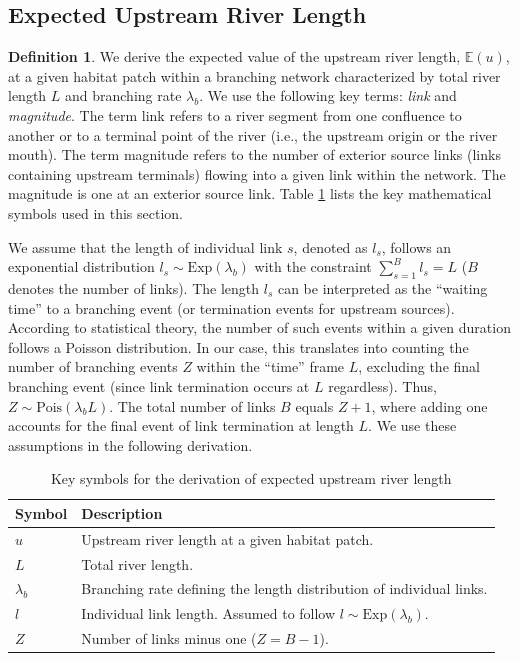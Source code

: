 \documentclass[11pt, class=article, crop=false]{standalone}
\theoremstyle{definition}
\newtheorem{definition}{Definition}[subsection]
\begin{document}
\newpage

\subsection{Expected Upstream River Length} \label{updist}

\begin{definition}
We derive the expected value of the upstream river length, $\mathbb{E}(u)$, at a given habitat patch within a branching network characterized by total river length $L$ and branching rate $\lambda_b$.
We use the following key terms: \textit{link} and \textit{magnitude}.
The term link refers to a river segment from one confluence to another or to a terminal point of the river (i.e., the upstream origin or the river mouth).
The term magnitude refers to the number of exterior source links (links containing upstream terminals) flowing into a given link within the network.
The magnitude is one at an exterior source link.
Table \ref{tab:key-symbol} lists the key mathematical symbols used in this section.

We assume that the length of individual link $s$, denoted as $l_s$, follows an exponential distribution $l_s \sim \mbox{Exp}(\lambda_b)$ with the constraint $\sum_{s = 1}^{B} l_s = L$ ($B$ denotes the number of links).
The length $l_s$ can be interpreted as the ``waiting time'' to a branching event (or termination events for upstream sources).
According to statistical theory, the number of such events within a given duration follows a Poisson distribution.
In our case, this translates into counting the number of branching events $Z$ within the ``time'' frame $L$, excluding the final branching event (since link termination occurs at $L$ regardless).
Thus, $Z \sim \mbox{Pois}(\lambda_b L)$.
The total number of links $B$ equals $Z + 1$, where adding one accounts for the final event of link termination at length $L$.
We use these assumptions in the following derivation.

\begin{table}
    \centering
    \caption{Key symbols for the derivation of expected upstream river length}
    \begin{tabularx}{\textwidth}{ll}
        \hline
        Symbol & Description\\
        \hline
        $u$ & Upstream river length at a given habitat patch.\\
        $L$ & Total river length.\\
        $\lambda_b$ & Branching rate defining the length distribution of individual links.\\
        $l$ & Individual link length. Assumed to follow $l \sim \mbox{Exp}(\lambda_b)$.\\
        $Z$ & Number of links minus one ($Z = B - 1$).\\
        \hline
    \end{tabularx}
    \label{tab:key-symbol}
\end{table}

\end{definition}
\end{document}
